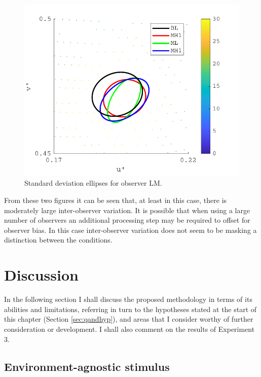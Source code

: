 \begin{figure}[hbtp]
\includegraphics[max width=\textwidth]{figs/tablet/PAMELA_20180205_Individual2.pdf} 
\caption{Standard deviation ellipses for observer LM.}
\label{fig:PAMELA_20180205_Individual2}
\end{figure}

From these two figures it can be seen that, at least in this case, there is moderately large inter-observer variation. It is possible that when using a large number of observers an additional processing step may be required to offset for observer bias. In this case inter-observer variation does not seem to be masking a distinction between the conditions.

\clearpage

\section{Discussion}

In the following section I shall discuss the proposed methodology in terms of its abilities and limitations, referring in turn to the hypotheses stated at the start of this chapter (Section \ref{sec:qandhyp}), and areas that I consider worthy of further consideration or development. I shall also comment on the results of Experiment 3.

\subsection{Environment-agnostic stimulus}

